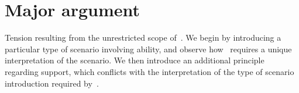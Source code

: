 




\section{Major argument}
\label{sec:broad-argum-overv}

\begin{note}[Overview]
  Tension resulting from the unrestricted scope of~\ESU{}.
  We begin by introducing a particular type of scenario involving ability, and observe how~\ESU{} requires a unique interpretation of the scenario.
  We then introduce an additional principle regarding support, which conflicts with the interpretation of the type of scenario introduction required by~\ESU{}.
\end{note}

